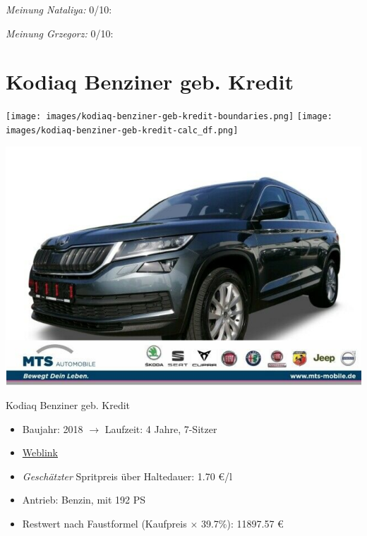 \documentclass[landscape, DIV=99, 14pt]{scrartcl}
\begin{document}
\begin{small}
\emph{Meinung Nataliya:} 0/10: 
        
\emph{Meinung Grzegorz:} 0/10: 
\end{small}

\pagebreak


\twocolumn

\section*{Kodiaq Benziner geb. Kredit}
\begin{center}
\texttt{[image: images/kodiaq-benziner-geb-kredit-boundaries.png]}
\null
\vspace{0.5cm}
\texttt{[image: images/kodiaq-benziner-geb-kredit-calc\_df.png]}
\end{center}

\pagebreak
\begin{center}
\includegraphics[width=0.9\columnwidth]{cars/skoda-kodiaq-4x4-2p0-tsi.png}

Kodiaq Benziner geb. Kredit
\end{center}

\begin{itemize}
    \item Baujahr: 2018 $\rightarrow$ Laufzeit: 4 Jahre, 7-Sitzer
    \item \href{https://suchen.mobile.de/fahrzeuge/details.html?action=parkItem&id=336255689}{Weblink}
    \item \emph{Gesch\"atzter} Spritpreis \"uber Haltedauer: 1.70 \euro{}/l
    \item Antrieb: Benzin, mit 192 PS
    \item Restwert nach Faustformel (Kaufpreis $\times$ 39.7\%): 11897.57 \euro{}
\end{itemize}
\end{document}
